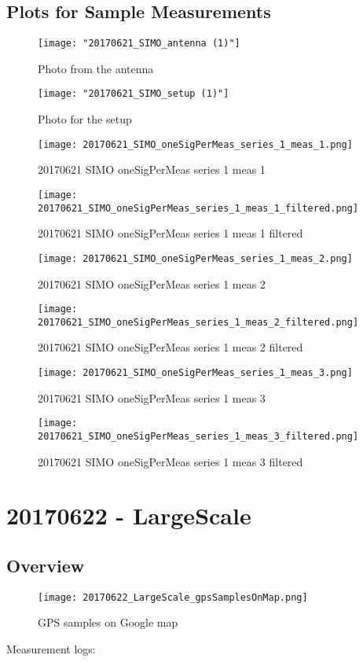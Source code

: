 \subsection{Plots for Sample Measurements}
\begin{figure}[ht] \caption{Photo from the antenna}
\texttt{[image: "20170621\_SIMO\_antenna (1)"]}\centering\end{figure}
\begin{figure}[ht] \caption{Photo for the setup}
\texttt{[image: "20170621\_SIMO\_setup (1)"]}\centering\end{figure}
\begin{figure}[ht] \caption{20170621 SIMO oneSigPerMeas series 1 meas 1}
\texttt{[image: 20170621\_SIMO\_oneSigPerMeas\_series\_1\_meas\_1.png]}\centering\end{figure}
\begin{figure}[ht] \caption{20170621 SIMO oneSigPerMeas series 1 meas 1 filtered}
\texttt{[image: 20170621\_SIMO\_oneSigPerMeas\_series\_1\_meas\_1\_filtered.png]}\centering\end{figure}
\begin{figure}[ht] \caption{20170621 SIMO oneSigPerMeas series 1 meas 2}
\texttt{[image: 20170621\_SIMO\_oneSigPerMeas\_series\_1\_meas\_2.png]}\centering\end{figure}
\begin{figure}[ht] \caption{20170621 SIMO oneSigPerMeas series 1 meas 2 filtered}
\texttt{[image: 20170621\_SIMO\_oneSigPerMeas\_series\_1\_meas\_2\_filtered.png]}\centering\end{figure}
\begin{figure}[ht] \caption{20170621 SIMO oneSigPerMeas series 1 meas 3}
\texttt{[image: 20170621\_SIMO\_oneSigPerMeas\_series\_1\_meas\_3.png]}\centering\end{figure}
\begin{figure}[ht] \caption{20170621 SIMO oneSigPerMeas series 1 meas 3 filtered}
\texttt{[image: 20170621\_SIMO\_oneSigPerMeas\_series\_1\_meas\_3\_filtered.png]}\centering\end{figure}
\clearpage
\section{20170622 - LargeScale}
\subsection{Overview}
\begin{figure}[ht] \caption{GPS samples on Google map}
\texttt{[image: 20170622\_LargeScale\_gpsSamplesOnMap.png]}\centering\end{figure}
\begin{minipage}{\textwidth} Measurement logs:

 \end{minipage}
\clearpage

